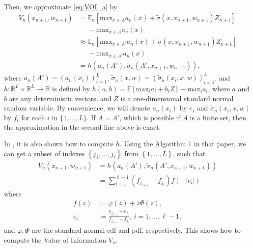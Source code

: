 \documentclass{article}
\newcommand{\w}{w}
\newcommand{\sigmatilde}{\tilde{\sigma}}
\begin{document}
Then, we approximate \eqref{eq:VOI_a} by
\begin{align*}
V_n(x_{n+1},\w_{n+1}) 
&= \mathbb{E}_{n}\left[\mbox{max}_{x\in A} a_{n}\left(x\right) + \sigmatilde(x, x_{n+1},\w_{n+1})Z_{n+1}\right]\\
  &\phantom{{}=}-\mbox{max}_{x \in A} a_{n}\left(x\right)\\
&\approx \mathbb{E}_{n}\left[\mbox{max}_{x\in A'} a_{n}\left(x\right) + \sigmatilde(x, x_{n+1},\w_{n+1})Z_{n+1}\right]\\
&\phantom{{}\approx}-\mbox{max}_{x \in A'} a_{n}\left(x\right)\\
&=h(a_n(A'),\sigmatilde_n(A',x_{n+1},\w_{n+1})),
\end{align*}
where 
$a_{n}(A')=\left(a_{n}\left(x_{i}\right)\right)_{i=1}^{L}$,
$\tilde{\sigma}_{n}\left(x,\w\right)=\left(\tilde{\sigma}_{n}\left(x_{i},x,\w\right)\right)_{i=1}^{L}$, and 
$h:\mathbb{R}^{L}\times\mathbb{R}^{L}\rightarrow\mathbb{R}$ is defined
by $h\left(a,b\right)=\mathbb{E}\left[\mbox{max}_{i}a_{i}+b_{i}Z\right]-\mbox{max}_{i}a_{i}$,
where $a$ and $b$ are any deterministic vectors, and $Z$ is a one-dimensional
standard normal random variable. By convenience, we will denote $a_{n}\left(x_{i}\right)$ by $e_{i}$ and 
$\tilde{\sigma}_{n}\left(x_{i},x,\w\right)$ by $f_{i}$ for each $i$ in $\{1,\ldots,L\}$.
If $A = A'$, which is possible if $A$ is a finite set, then the approximation in the second line above is exact.

In \cite{frazier2009knowledge}, it is also shown how to compute $h$. Using the Algorithm 1 in that paper, we can get a subset of indexes
$\left\{ j_{1},\ldots,j_{\ell}\right\}$ from $\left\{ 1,\ldots,L\right\}$, such that %
\begin{align*}
V_n(x_{n+1},\w_{n+1})
&=h(a_n(A'),\sigmatilde_n(A',x_{n+1},\w_{n+1}))\\
&=\sum_{i=1}^{\ell-1}\left(f_{j_{i+1}}-f_{j_{i}}\right)f\left(-\left|c_{i}\right|\right)
\end{align*}
where
\begin{align*}
f\left(z\right) & := \varphi\left(z\right)+z\Phi\left(z\right),\\
c_{i} & :=  \frac{e_{j_{i+1}}-e_{j_{i}}}{f_{j_{i+1}}-f_{j_{i}}}\mbox{, }i=1,\ldots,\ell-1,
\end{align*}
and $\varphi,\Phi$ are the standard normal cdf and pdf, respectively. This shows how to compute the Value of Information
$V_n$.
\end{document}
